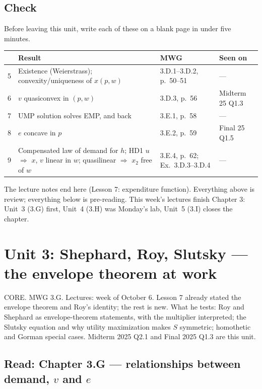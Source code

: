 \documentclass[11pt]{article}
\begin{document}
\subsection{Check}
Before leaving this unit, write each of these on a blank page in under five minutes.
\begin{center}\small\begin{tabular}{rp{7.4cm}p{3.3cm}p{3.1cm}}\toprule & Result & MWG & Seen on\\\midrule
5 & Existence (Weierstrass); convexity/uniqueness of $x(p,w)$ & 3.D.1--3.D.2, p.~50--51 & ---\\
6 & $v$ quasiconvex in $(p,w)$ & 3.D.3, p.~56 & Midterm 25 Q1.3\\
7 & UMP solution solves EMP, and back & 3.E.1, p.~58 & ---\\
8 & $e$ concave in $p$ & 3.E.2, p.~59 & Final 25 Q1.5\\
9 & Compensated law of demand for $h$; HD1 $u$ $\Rightarrow$ $x$, $v$ linear in $w$; quasilinear $\Rightarrow$ $x_2$ free of $w$ & 3.E.4, p.~62; Ex.~3.D.3--3.D.4 & ---\\
\bottomrule\end{tabular}\end{center}

\begin{here}
The lecture notes end here (Lesson 7: expenditure function). Everything above is review; everything below is pre-reading. This week's lectures finish Chapter 3: Unit~3 (3.G) first, Unit~4 (3.H) was Monday's lab, Unit~5 (3.I) closes the chapter.
\end{here}

\clearpage
\section{Unit 3: Shephard, Roy, Slutsky --- the envelope theorem at work}
\begin{unit}{CORE. MWG 3.G. Lectures: week of October 6. Lesson 7 already stated the envelope theorem and Roy's identity; the rest is new.}
What he tests: Roy and Shephard as envelope-theorem statements, with the multiplier interpreted; the Slutsky equation and why utility maximization makes $S$ symmetric; homothetic and Gorman special cases. Midterm 2025 Q2.1 and Final 2025 Q1.3 are this unit.
\end{unit}
\subsection{Read: Chapter 3.G --- relationships between demand, $v$ and $e$}\label{sec:slutsky}
\end{document}
